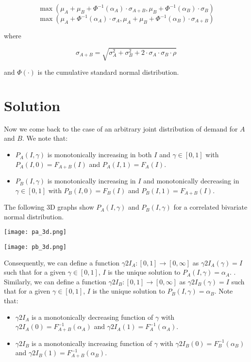 \documentclass[11pt]{article}   	%
\begin{document}
$$\max{(\mu_A + \mu_B + \Phi^{-1}(\alpha_A) \cdot \sigma_{A+B}, \mu_B + \Phi^{-1}(\alpha_B) \cdot \sigma_B)}$$
$$\max{(\mu_A + \Phi^{-1}(\alpha_A) \cdot \sigma_A, \mu_A + \mu_B + \Phi^{-1}(\alpha_B) \cdot \sigma_{A+B})}$$

where

$$ \sigma_{A+B} = \sqrt{\sigma_A^2 + \sigma_B^2 + 2 \cdot \sigma_A \cdot \sigma_B \cdot \rho}$$

and $\Phi(\cdot)$ is the cumulative standard normal distribution.

\section{Solution}

Now we come back to the case of an arbitrary joint distribution of demand for $A$ and $B$. We note that:

\begin{itemize}
\item $P_A(I, \gamma)$ is monotonically increasing in both $I$ and $\gamma \in [0, 1]$ with $P_A(I, 0) = F_{A+B}(I)$ and $P_A(I, 1) = F_A(I)$.
\item $P_B(I, \gamma)$ is monotonically increasing in $I$ and monotonically decreasing in $\gamma \in [0,1]$ with $P_B(I, 0) = F_B(I)$ and $P_B(I, 1) = F_{A+B}(I)$.
\end{itemize}

The following 3D graphs show $P_A(I, \gamma)$ and $P_B(I, \gamma)$ for a correlated bivariate normal distribution.

\texttt{[image: pa\_3d.png]}

\texttt{[image: pb\_3d.png]}

 Consequently, we can define a function $\gamma 2I_A : [0,1] \rightarrow [0, \infty]$ as $\gamma 2I_A(\gamma) = I$ such that for a given $\gamma \in [0,1]$, $I$ is the unique solution to $P_A(I, \gamma) = \alpha_A$. . Similarly, we can define a function $\gamma 2I_B : [0,1] \rightarrow [0, \infty]$ as $\gamma 2I_B(\gamma) = I$ such that for a given $\gamma \in [0,1]$, $I$ is the unique solution to $P_B(I, \gamma) = \alpha_B$. Note that:

\begin{itemize}
\item $\gamma 2I_A$ is a monotonically decreasing function of $\gamma $ with $\gamma 2I_A(0) = F_{A+B}^{-1}(\alpha_A)$ and $\gamma 2I_A(1) = F_A^{-1}(\alpha_A)$.
\item $\gamma 2I_B$ is a monotonically increasing function of $\gamma$ with $\gamma 2I_B(0) = F_B^{-1}(\alpha_B)$ and $\gamma 2I_B(1) = F_{A+B}^{-1}(\alpha_B)$.
\end{itemize}
\end{document}
